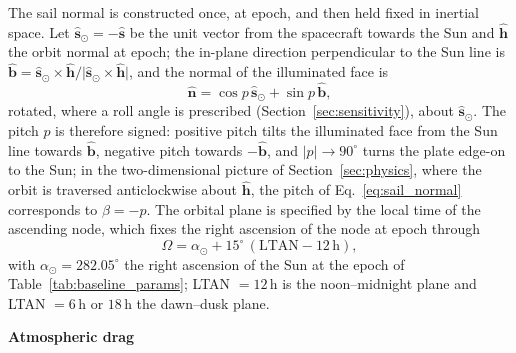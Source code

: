 \par\noindent The sail normal is constructed once, at epoch, and then held fixed in inertial space. Let \(\hat{\mathbf{s}}_{\odot} = -\hat{\mathbf{s}}\) be the unit vector from the spacecraft towards the Sun and \(\hat{\mathbf{h}}\) the orbit normal at epoch; the in-plane direction perpendicular to the Sun line is \(\hat{\mathbf{b}} = \hat{\mathbf{s}}_{\odot}\times\hat{\mathbf{h}}/\lvert\hat{\mathbf{s}}_{\odot}\times\hat{\mathbf{h}}\rvert\), and the normal of the illuminated face is
\begin{equation}
\hat{\mathbf{n}} = \cos p\,\hat{\mathbf{s}}_{\odot} + \sin p\,\hat{\mathbf{b}},
\label{eq:sail_normal}
\end{equation}
rotated, where a roll angle is prescribed (Section~\ref{sec:sensitivity}), about \(\hat{\mathbf{s}}_{\odot}\). The pitch \(p\) is therefore signed: positive pitch tilts the illuminated face from the Sun line towards \(\hat{\mathbf{b}}\), negative pitch towards \(-\hat{\mathbf{b}}\), and \(\lvert p\rvert \to 90^\circ\) turns the plate edge-on to the Sun; in the two-dimensional picture of Section~\ref{sec:physics}, where the orbit is traversed anticlockwise about \(\hat{\mathbf{h}}\), the pitch of Eq.~\eqref{eq:sail_normal} corresponds to \(\beta = -p\). The orbital plane is specified by the local time of the ascending node, which fixes the right ascension of the node at epoch through
\begin{equation}
\Omega = \alpha_{\odot} + 15^\circ\,(\mathrm{LTAN} - 12\,\mathrm{h}),
\label{eq:ltan_raan}
\end{equation}
with \(\alpha_{\odot} = 282.05^\circ\) the right ascension of the Sun at the epoch of Table~\ref{tab:baseline_params}; LTAN \(= 12\,\mathrm{h}\) is the noon--midnight plane and LTAN \(= 6\,\mathrm{h}\) or \(18\,\mathrm{h}\) the dawn--dusk plane.

\vspace{5pt}
\noindent\textbf{Atmospheric drag} \vspace{2pt}

